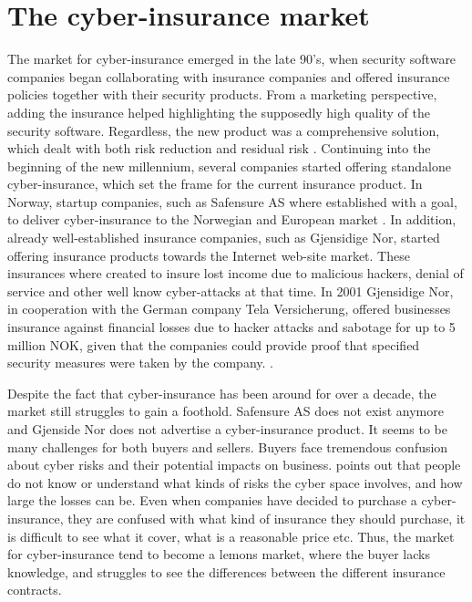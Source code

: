 \chapter{The cyber-insurance market}




The market for cyber-insurance emerged in the late 90's, when security software companies began collaborating with insurance companies and offered insurance policies together with their security products. From a marketing perspective, adding the insurance helped highlighting the supposedly high quality of the security software. Regardless, the new product was a comprehensive solution, which dealt with both risk reduction and residual risk \cite{bolot2008new}. Continuing into the beginning of the new millennium, several companies started offering standalone cyber-insurance, which set the frame for the current insurance product. In Norway, startup companies, such as Safensure AS where established with a goal, to deliver cyber-insurance to the Norwegian and European market \cite{digi}. In addition, already well-established insurance companies, such as Gjensidige Nor, started offering insurance products towards the Internet web-site market. These insurances where created to insure lost income due to malicious hackers, denial of service and other well know cyber-attacks at that time. In 2001 Gjensidige Nor, in cooperation with the German company Tela Versicherung, offered businesses insurance against financial losses due to hacker attacks and sabotage for up to 5 million NOK, given that the companies could provide proof that specified security measures were taken by the company. \cite{dagensithackerforsikring}. 
 

Despite the fact that cyber-insurance has been around for over a decade, the market still struggles to gain a foothold. Safensure AS does not exist anymore and Gjenside Nor does not advertise a cyber-insurance product. It seems to be many challenges for both buyers and sellers. Buyers face tremendous confusion about cyber risks and their potential impacts on business. 
\cite{Cyberworkshop} points out that people do not know or understand what kinds of risks the cyber space involves, and how large the losses can be. Even when companies have decided to purchase a cyber-insurance, they are confused with what kind of insurance they should purchase, it is difficult to see what it cover, what is a reasonable price etc. Thus, the market for cyber-insurance tend to become a lemons market, where the buyer lacks knowledge, and struggles to see the differences between the different insurance contracts.


